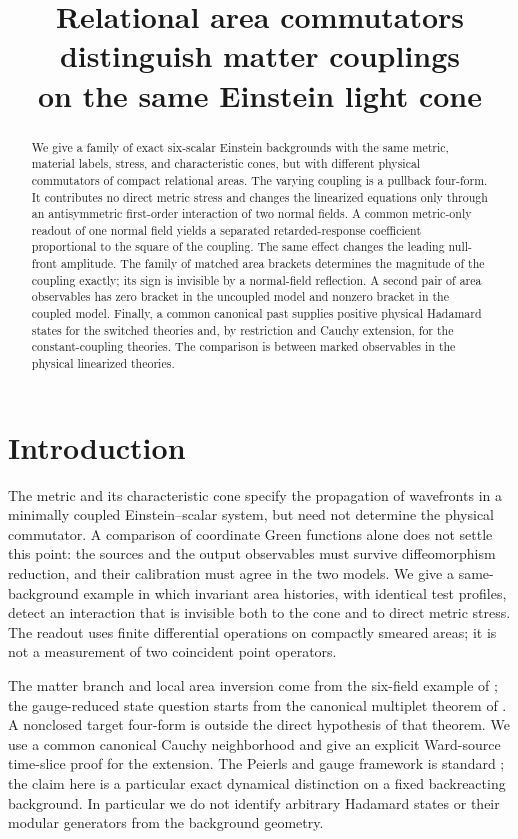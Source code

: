 \documentclass[11pt]{article}
\title{Relational area commutators distinguish matter couplings\\on the same Einstein light cone}
\author{}
\date{}
\begin{document}
\maketitle
\begin{abstract}
We give a family of exact six-scalar Einstein backgrounds with the same metric, material labels, stress, and characteristic cones, but with different physical commutators of compact relational areas. The varying coupling is a pullback four-form. It contributes no direct metric stress and changes the linearized equations only through an antisymmetric first-order interaction of two normal fields. A common metric-only readout of one normal field yields a separated retarded-response coefficient proportional to the square of the coupling. The same effect changes the leading null-front amplitude. The family of matched area brackets determines the magnitude of the coupling exactly; its sign is invisible by a normal-field reflection. A second pair of area observables has zero bracket in the uncoupled model and nonzero bracket in the coupled model. Finally, a common canonical past supplies positive physical Hadamard states for the switched theories and, by restriction and Cauchy extension, for the constant-coupling theories. The comparison is between marked observables in the physical linearized theories.
\end{abstract}

\section{Introduction}

The metric and its characteristic cone specify the propagation of wavefronts in a minimally coupled Einstein--scalar system, but need not determine the physical commutator. A comparison of coordinate Green functions alone does not settle this point: the sources and the output observables must survive diffeomorphism reduction, and their calibration must agree in the two models. We give a same-background example in which invariant area histories, with identical test profiles, detect an interaction that is invisible both to the cone and to direct metric stress. The readout uses finite differential operations on compactly smeared areas; it is not a measurement of two coincident point operators.

The matter branch and local area inversion come from the six-field example of \cite{P46}; the gauge-reduced state question starts from the canonical multiplet theorem of \cite{P09}. A nonclosed target four-form is outside the direct hypothesis of that theorem. We use a common canonical Cauchy neighborhood and give an explicit Ward-source time-slice proof for the extension. The Peierls and gauge framework is standard \cite{HackSchenkel,Khavkine}; the claim here is a particular exact dynamical distinction on a fixed backreacting background. In particular we do not identify arbitrary Hadamard states or their modular generators from the background geometry.
\end{document}
